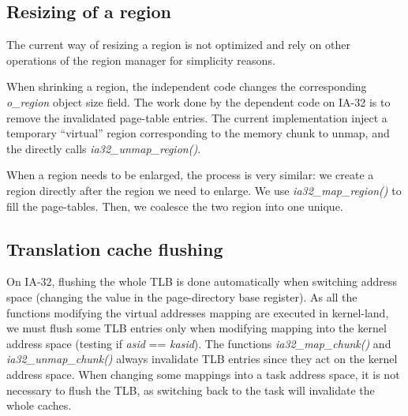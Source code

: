 %
%

\subsection{Resizing of a region}

The current way of resizing a region is not optimized and rely on
other operations of the region manager for simplicity reasons.

When shrinking a region, the independent code changes the
corresponding \textit{o\_region} object size field. The work done by
the dependent code on IA-32 is to remove the invalidated page-table
entries. The current implementation inject a temporary ``virtual''
region corresponding to the memory chunk to unmap, and the directly
calls \textit{ia32\_unmap\_region()}.

When a region needs to be enlarged, the process is very similar: we
create a region directly after the region we need to enlarge. We use
\textit{ia32\_map\_region()} to fill the page-tables. Then, we
coalesce the two region into one unique.

%
%

\subsection{Translation cache flushing}

On IA-32, flushing the whole TLB is done automatically when switching
address space (changing the value in the page-directory base
register). As all the functions modifying the virtual addresses
mapping are executed in kernel-land, we must flush some TLB entries
only when modifying mapping into the kernel address space (testing if
\textit{asid} == \textit{kasid}). The functions
\textit{ia32\_map\_chunk()} and \textit{ia32\_unmap\_chunk()} always
invalidate TLB entries since they act on the kernel address space.
When changing some mappings into a task address space, it is not
necessary to flush the TLB, as switching back to the task will
invalidate the whole caches.
